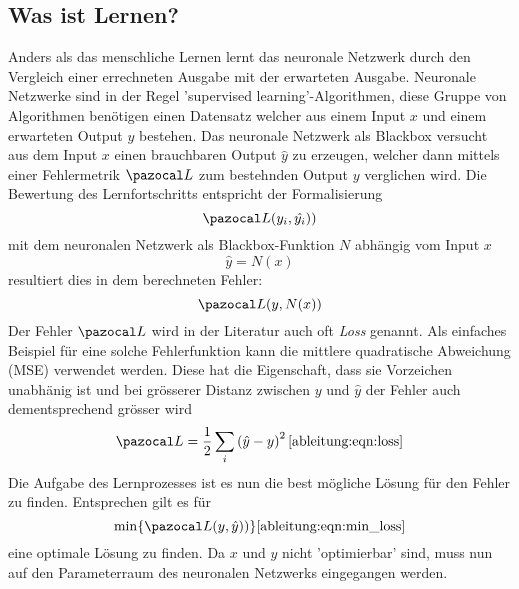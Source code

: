 \subsection{Was ist Lernen?}
Anders als das menschliche Lernen lernt das neuronale Netzwerk durch den Vergleich einer errechneten Ausgabe mit der erwarteten Ausgabe.
Neuronale Netzwerke sind in der Regel 'supervised learning'-Algorithmen, diese Gruppe von Algorithmen benötigen einen Datensatz welcher aus einem Input $x$ und einem erwarteten Output $y$ bestehen.
Das neuronale Netzwerk als Blackbox versucht aus dem Input $x$ einen brauchbaren Output $\hat{y}$ zu erzeugen, welcher dann mittels einer Fehlermetrik $\Lb$ zum bestehnden Output $y$ verglichen wird.
Die Bewertung des Lernfortschritts entspricht der Formalisierung
\begin{equation}
	\Lb(y_{i},\hat{y_i}))
\end{equation}
mit dem neuronalen Netzwerk als Blackbox-Funktion $N$ abhängig vom Input $x$
\begin{equation}
\hat{y} = N(x)
\end{equation}
resultiert dies in dem berechneten Fehler:
\begin{equation}
\Lb(y,N(x))
\end{equation}
Der Fehler $\Lb$ wird in der Literatur auch oft \textit{Loss} genannt.
Als einfaches Beispiel für eine solche Fehlerfunktion kann die mittlere quadratische Abweichung (MSE) verwendet werden. Diese hat die Eigenschaft, dass sie Vorzeichen unabhänig ist und bei grösserer Distanz zwischen $y$ und $\hat{y}$ der Fehler auch dementsprechend grösser wird
\begin{equation}
\Lb = \frac{1}{2} \sum_i \left( \hat{y} - y \right)^2
\ref{ableitung:eqn:loss}
\end{equation}
Die Aufgabe des Lernprozesses ist es nun die best mögliche Lösung für den Fehler zu finden. Entsprechen gilt es für
\begin{equation}
	\min \{ \Lb(y,\hat{y})) \}
	\ref{ableitung:eqn:min_loss}
\end{equation}
eine optimale Lösung zu finden. Da $x$ und $y$ nicht 'optimierbar' sind, muss nun auf den Parameterraum des neuronalen Netzwerks eingegangen werden.

